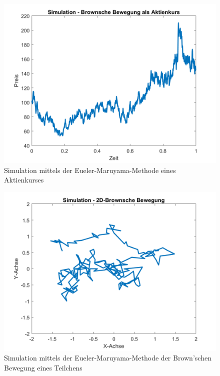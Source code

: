 \begin{figure}
	\centering
	\includegraphics[width=0.7\linewidth]{papers/brown/images/Aktienkurs-als-Brownische-Bewegung_2.png}
	\caption{Simulation mittels der Eueler-Maruyama-Methode eines Aktienkurses}
\end{figure}

\begin{figure}
	\centering
	\includegraphics[width=0.7\linewidth]{papers/brown/images/Brownische-Bewegung-Simuliert_2.png}
	\caption{Simulation mittels der Eueler-Maruyama-Methode der Brown'schen Bewegung eines Teilchens}
\end{figure}


